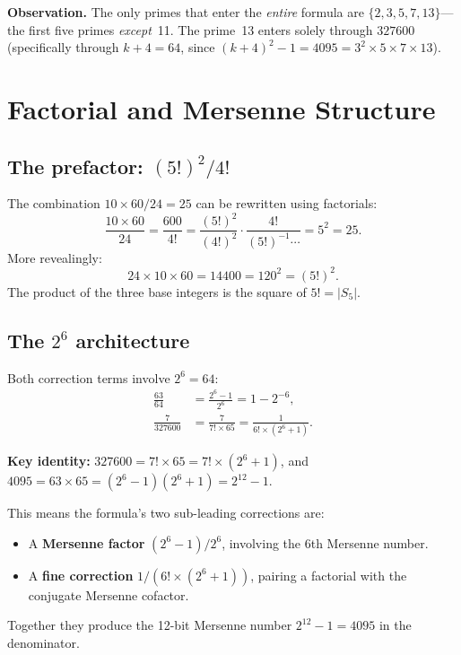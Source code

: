 \documentclass[11pt]{article}
\begin{document}
\medskip\noindent
\textbf{Observation.} The only primes that enter the \emph{entire} formula are
$\{2,3,5,7,13\}$---the first five primes \emph{except}~11.
The prime~13 enters solely through $327600$ (specifically through $k+4=64$,
since $(k+4)^2-1 = 4095 = 3^2\times 5\times 7\times 13$).

\section{Factorial and Mersenne Structure}
\label{sec:factorial}

\subsection{The prefactor: $(5!)^2/4!$}

The combination $10\times 60/24 = 25$ can be rewritten using factorials:
\begin{equation}
\frac{10\times 60}{24}
= \frac{600}{4!}
= \frac{(5!)^2}{(4!)^2}\cdot\frac{4!}{(5!)^{-1}\cdots}
= 5^2 = 25.
\end{equation}
More revealingly:
\[
24\times 10\times 60 = 14400 = 120^2 = (5!)^2.
\]
The product of the three base integers is the square of $5! = |S_5|$.

\subsection{The $2^6$ architecture}

Both correction terms involve $2^6 = 64$:
\begin{align}
\frac{63}{64} &= \frac{2^6 - 1}{2^6} = 1 - 2^{-6},
\label{eq:mersenne6}\\[4pt]
\frac{7}{327600}
&= \frac{7}{7!\times 65}
= \frac{1}{6!\times(2^6+1)}.
\label{eq:correction}
\end{align}

\noindent
\textbf{Key identity:} $327600 = 7!\times 65 = 7!\times(2^6+1)$,
and $4095 = 63\times 65 = (2^6-1)(2^6+1) = 2^{12}-1$.

This means the formula's two sub-leading corrections are:
\begin{itemize}
\item A \textbf{Mersenne factor} $(2^6-1)/2^6$, involving the 6th Mersenne number.
\item A \textbf{fine correction} $1/(6!\times(2^6+1))$, pairing a factorial with
      the conjugate Mersenne cofactor.
\end{itemize}
Together they produce the 12-bit Mersenne number $2^{12}-1=4095$ in the denominator.
\end{document}
